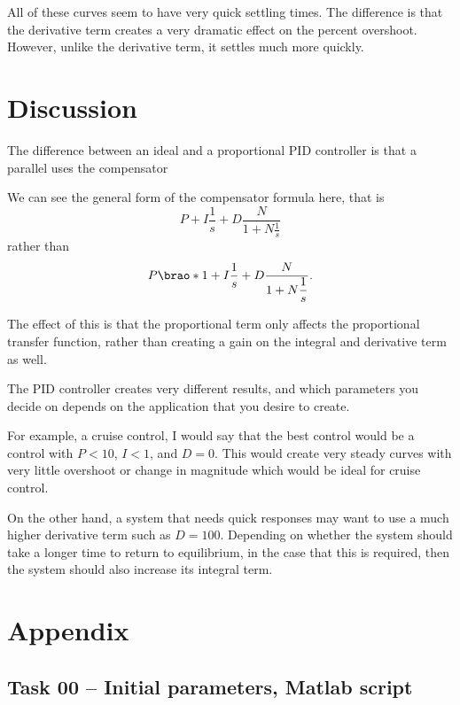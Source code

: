 \documentclass[12pt]{article}
\DeclarePairedDelimiter\brao()%
\begin{document}
All of these curves seem to have very quick settling times. The difference is that the derivative term creates a very dramatic effect on the percent overshoot. However, unlike the derivative term, it settles much more quickly.

\section{Discussion}

The difference between an ideal and a proportional PID controller is that a parallel uses the compensator

We can see the general form of the compensator formula here, that is
\begin{equation}
    P + I\frac1s + D\frac{N}{\displaystyle1 + N\frac1s}
\end{equation}
rather than
\begin{equation}
    P\brao*{1 + I\frac1s + D\frac{N}{\displaystyle1 + N\frac1s}}.
\end{equation}

The effect of this is that the proportional term only affects the proportional transfer function, rather than creating a gain on the integral and derivative term as well.

The PID controller creates very different results, and which parameters you decide on depends on the application that you desire to create.

For example, a cruise control, I would say that the best control would be a control with $P < 10$, $I < 1$, and $D = 0$. This would create very steady curves with very little overshoot or change in magnitude which would be ideal for cruise control.

On the other hand, a system that needs quick responses may want to use a much higher derivative term such as $D=100$. Depending on whether the system should take a longer time to return to equilibrium, in the case that this is required, then the system should also increase its integral term.

\newpage
\printbibliography

\newpage
\appendix
\section{Appendix}\label{app}

\subsection{Task 00 -- Initial parameters, Matlab script}\label{sap:initial params}
\inputminted{matlab}{src/lab09_task00_initial_dc_motor_motor_params.m}
\end{document}
